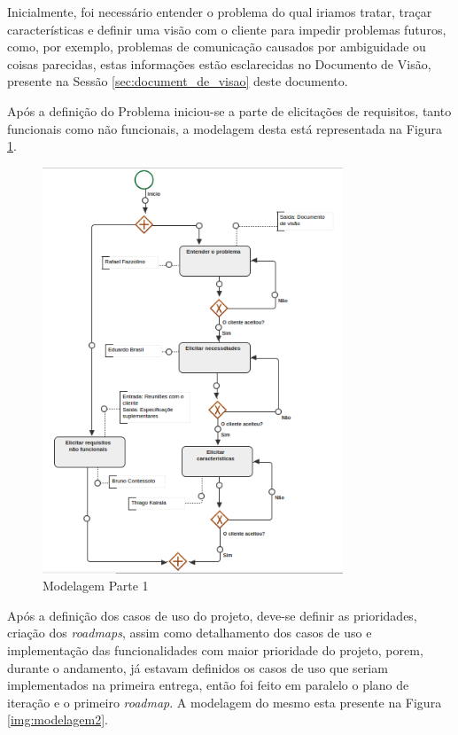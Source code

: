 
Inicialmente, foi necessário entender o problema do qual iriamos tratar, traçar características e definir uma visão com o cliente para impedir problemas futuros, como, por exemplo, problemas de comunicação causados por ambiguidade ou coisas parecidas, estas informações estão esclarecidas no Documento de Visão, presente na Sessão \ref{sec:document_de_visao} deste documento.

Após a definição do Problema iniciou-se a parte de elicitações de requisitos, tanto funcionais como não funcionais, a modelagem desta está representada na Figura \ref{img:modelagem1}.

\begin{figure}[H]
	\centering
	\includegraphics[width=0.8\textwidth]{imgModelagem/modelagem1}
	\caption{Modelagem Parte 1}
	\label{img:modelagem1}
\end{figure}


Após a definição dos casos de uso do projeto, deve-se definir as prioridades, criação dos \textit{roadmaps}, assim como detalhamento dos casos de uso e implementação das funcionalidades com maior prioridade do projeto, porem, durante o andamento, já estavam definidos os casos de uso que seriam implementados na primeira entrega, então foi feito em paralelo o plano de iteração e o primeiro \textit{roadmap}. A modelagem do mesmo esta presente na Figura \ref{img:modelagem2}.

